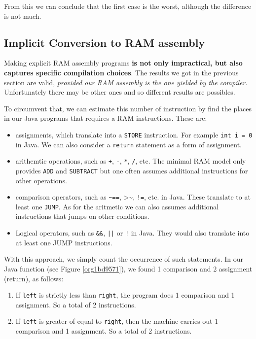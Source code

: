 \documentclass[11pt]{article}
\begin{document}
From this we can conclude that the first case is the worst, although
the difference is not much.

\subsection{Implicit Conversion to RAM assembly}
\label{sec:orgb15cbae}

Making explicit RAM assembly programs \textbf{is not only impractical, but
also captures specific compilation choices}. The results we got in the
previous section are valid, \emph{provided our RAM assembly is the one
yielded by the compiler}. Unfortunately there may be other ones and so
different results are possibles.

To circumvent that, we can estimate this number of instruction by find
the places in our Java programs that requires a RAM
instructions. These are:
\begin{itemize}
\item assignments, which translate into a \texttt{STORE} instruction. For
example \texttt{int i = 0} in Java. We can also consider a 
\texttt{return} statement as a form of assignment.
\item arithemtic operations, such as \texttt{+}, \texttt{-}, \texttt{*}, \texttt{/}, etc. The minimal
RAM model only provides \texttt{ADD} and \texttt{SUBTRACT} but one often assumes
additional instructions for other operations.
\item comparison operators, such as \texttt{\textasciitilde{}==}, >\textasciitilde{}, \texttt{!=}, etc. in Java. These
translate to at least one \texttt{JUMP}. As for the aritmetic we can also
assumes additional instructions that jumps on other
conditions.
\item Logical operators, such as \texttt{\&\&}, \texttt{||} or \texttt{!} in Java. They would
also translate into at least one JUMP instructions.
\end{itemize}

With this approach, we simply count the occurrence of such
statements. In our Java function (see Figure \ref{org1bd9571}), we found 1
comparison and 2 assignment (return), as follows:

\begin{enumerate}
\item If \texttt{left} is strictly less than \texttt{right}, the program does 1
comparison and 1 assignment. So a total of 2 instructions.

\item If \texttt{left} is greater of equal to \texttt{right}, then the machine carries
out 1 comparison and 1 assignment. So a total of 2 instructions.
\end{enumerate}
\end{document}

